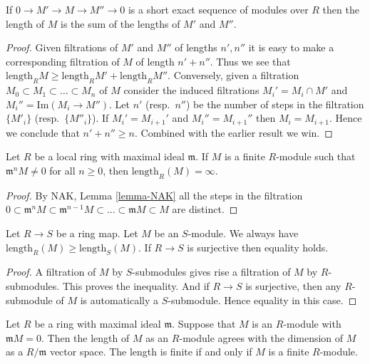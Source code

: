 \begin{lemma}
\label{lemma-length-additive}
If $0 \to M' \to M \to M'' \to 0$
is a short exact sequence of modules over $R$ then
the length of $M$ is the sum of the
lengths of $M'$ and $M''$.
\end{lemma}

\begin{proof}
Given filtrations of $M'$ and $M''$ of lengths $n', n''$
it is easy to make a corresponding filtration of $M$ 
of length $n' + n''$. Thus we see that $\text{length}_R M
\geq \text{length}_R M' + \text{length}_R M''$.
Conversely, given a filtration
$M_0 \subset M_1 \subset \ldots \subset M_n$ of
$M$ consider the induced filtrations
$M_i' = M_i \cap M'$ and $M_i'' = \text{Im}(M_i \to M'')$.
Let $n'$ (resp.\ $n''$) be the number of steps in the filtration
$\{M'_i\}$ (resp.\ $\{M''_i\}$).
If $M_i' = M_{i+1}'$ and $M_i'' = M_{i+1}''$ then
$M_i = M_{i+1}$. Hence we conclude that $n' + n'' \geq n$.
Combined with the earlier result we win.
\end{proof}

\begin{lemma}
\label{lemma-length-infinite}
Let $R$ be a local ring with maximal ideal $\mathfrak m$.
If $M$ is a finite $R$-module such that
$\mathfrak m^n M \not = 0$ for all $n\geq 0$,
then $\text{length}_R(M) = \infty$.
\end{lemma}

\begin{proof}
By NAK, Lemma \ref{lemma-NAK} all the steps in the filtration
$0 \subset \mathfrak m^n M 
\subset \mathfrak m^{n-1} M \subset \ldots \subset
\mathfrak m M \subset M$ are distinct.
\end{proof}

\begin{lemma}
\label{lemma-length-independent}
Let $R \to S$ be a ring map. Let $M$ be an $S$-module. 
We always have $\text{length}_R(M) \geq \text{length}_S(M)$.
If $R \to S$ is surjective then equality holds.
\end{lemma}

\begin{proof}
A filtration of $M$ by $S$-submodules gives rise a filtration
of $M$ by $R$-submodules. This proves the inequality.
And if $R \to S$ is surjective, then any $R$-submodule
of $M$ is automatically a $S$-submodule. Hence equality
in this case.
\end{proof}

\begin{lemma}
\label{lemma-dimension-is-length}
Let $R$ be a ring with maximal ideal $\mathfrak m$.
Suppose that $M$ is an $R$-module with
$\mathfrak m M  =  0$. Then the length of $M$ as
an $R$-module agrees with the dimension of $M$ as
a $R/\mathfrak m$ vector space. 
The length is finite if and only if $M$ is a finite $R$-module.
\end{lemma}

